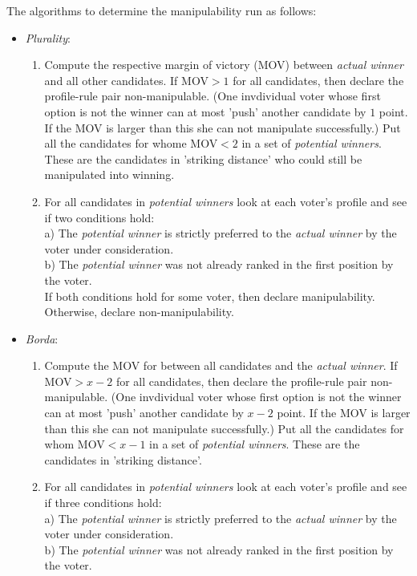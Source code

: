 \documentclass[10pt,a4paper]{article}
\begin{document}
\noindent The algorithms to determine the manipulability run as follows:\\
\begin{itemize}
\item \textit{Plurality}: \begin{enumerate}
\item  Compute the respective margin of victory (MOV) between \textit{actual winner} and all other candidates. If MOV$>1$ for all candidates, then declare the profile-rule pair non-manipulable. (One invdividual voter whose first option is not the winner can at most 'push' another candidate by $1$ point. If the MOV is larger than this she can not manipulate successfully.) Put all the candidates for whome MOV$<2$ in a set of \textit{potential winners}. These are the candidates in 'striking distance' who could still be manipulated into winning.
\item For all candidates in \textit{potential winners} look at each voter's profile and see if two conditions hold: \\
a) The \textit{potential winner} is strictly preferred to the \textit{actual winner} by the voter under consideration.\\
b) The \textit{potential winner} was not already ranked in the first position by the voter.\\
If both conditions hold for some voter, then declare manipulability. Otherwise, declare non-manipulability.
\end{enumerate}
\item \textit{Borda}: \begin{enumerate}
\item Compute the MOV for between all candidates and the \textit{actual winner}. If MOV$>x-2$ for all candidates, then declare the profile-rule pair non-manipulable. (One invdividual voter whose first option is not the winner can at most 'push' another candidate by $x-2$ point. If the MOV is larger than this she can not manipulate successfully.) Put all the candidates for whom MOV$<x-1$ in a set of \textit{potential winners}. These are the candidates in 'striking distance'.
\item For all candidates in \textit{potential winners} look at each voter's profile and see if three conditions hold: \\
a) The \textit{potential winner} is strictly preferred to the \textit{actual winner} by the voter under consideration.\\
b) The \textit{potential winner} was not already ranked in the first position by the voter.\\

\end{enumerate}
\end{itemize}
\end{document}
